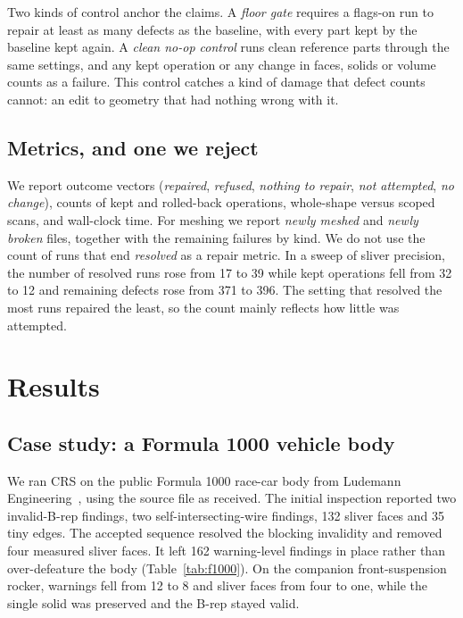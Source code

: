 \documentclass[11pt,onecolumn]{article}
\begin{document}
Two kinds of control anchor the claims. A \emph{floor gate} requires a flags-on run to repair at
least as many defects as the baseline, with every part kept by the baseline kept again. A \emph{clean
no-op control} runs clean reference parts through the same settings, and any kept operation or any
change in faces, solids or volume counts as a failure. This control catches a kind of damage that
defect counts cannot: an edit to geometry that had nothing wrong with it.

\subsection{Metrics, and one we reject}
We report outcome vectors (\emph{repaired}, \emph{refused}, \emph{nothing to repair}, \emph{not
attempted}, \emph{no change}), counts of kept and rolled-back operations, whole-shape versus scoped
scans, and wall-clock time. For meshing we report \emph{newly meshed} and \emph{newly broken} files,
together with the remaining failures by kind. We do not use the count of runs that end
\emph{resolved} as a repair metric. In a sweep of sliver precision, the number of resolved runs rose
from 17 to 39 while kept operations fell from 32 to 12 and remaining defects rose from 371 to 396.
The setting that resolved the most runs repaired the least, so the count mainly reflects how little
was attempted.

\section{Results}\label{sec:results}

\subsection{Case study: a Formula 1000 vehicle body}
We ran CRS on the public Formula 1000 race-car body from Ludemann Engineering~\cite{f1000}, using
the source file as received. The initial inspection reported two invalid-B-rep findings, two
self-intersecting-wire findings, 132 sliver faces and 35 tiny edges. The accepted sequence resolved
the blocking invalidity and removed four measured sliver faces. It left 162 warning-level findings
in place rather than over-defeature the body (Table~\ref{tab:f1000}). On the companion
front-suspension rocker, warnings fell from 12 to 8 and sliver faces from four to one, while the
single solid was preserved and the B-rep stayed valid.
\end{document}
